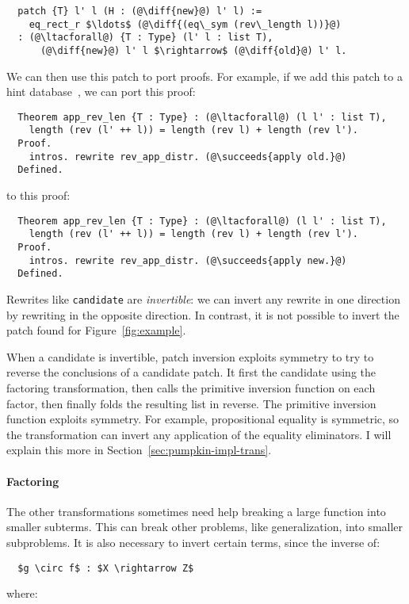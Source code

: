 \begin{lstlisting}
  patch {T} l' l (H : (@\diff{new}@) l' l) :=
    eq_rect_r $\ldots$ (@\diff{(eq\_sym (rev\_length l))}@)
  : (@\ltacforall@) {T : Type} (l' l : list T),
      (@\diff{new}@) l' l $\rightarrow$ (@\diff{old}@) l' l.
\end{lstlisting}
We can then use this patch to port proofs.
For example, if we add this patch to a hint database~\cite{hints},
we can port this proof:

\begin{lstlisting}
  Theorem app_rev_len {T : Type} : (@\ltacforall@) (l l' : list T),
    length (rev (l' ++ l)) = length (rev l) + length (rev l').
  Proof.
    intros. rewrite rev_app_distr. (@\succeeds{apply old.}@)
  Defined.
\end{lstlisting}
to this proof:

\begin{lstlisting}
  Theorem app_rev_len {T : Type} : (@\ltacforall@) (l l' : list T),
    length (rev (l' ++ l)) = length (rev l) + length (rev l').
  Proof.
    intros. rewrite rev_app_distr. (@\succeeds{apply new.}@)
  Defined.
\end{lstlisting}

Rewrites like \lstinline{candidate} are \textit{invertible}:
we can invert any rewrite in one direction by rewriting in the opposite direction.
In contrast, it is not possible to invert the patch \sysname
found for Figure~\ref{fig:example}.

When a candidate is invertible, patch inversion exploits symmetry to try to reverse the conclusions of a candidate patch.
It first  the candidate using the factoring transformation, then calls the primitive inversion
function on each factor, then finally folds the resulting list in reverse.
The primitive inversion function exploits symmetry. 
For example, propositional equality is symmetric, so the transformation can invert any application of the equality eliminators.
I will explain this more in Section~\ref{sec:pumpkin-impl-trans}.

\paragraph{Factoring} The other transformations sometimes need help breaking a large function into smaller subterms.
This can break other problems, like generalization, into smaller subproblems.
It is also necessary to invert certain terms, since the inverse of:

\begin{lstlisting}
  $g \circ f$ : $X \rightarrow Z$
\end{lstlisting}
where:

